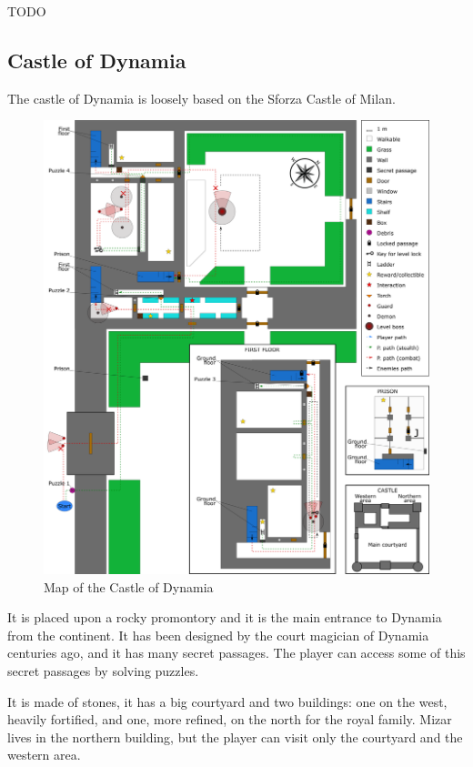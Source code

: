 TODO

\subsection{Castle of Dynamia}
The castle of Dynamia is loosely based on the Sforza Castle of Milan.

\begin{figure}[H]
  \centering
  \includegraphics[width=\textwidth]{Images/Maps/castleOfDynamia}
  \caption{Map of the Castle of Dynamia}
\end{figure}

It is placed upon a rocky promontory and it is the main entrance to Dynamia from the continent. It has been designed by the court magician of Dynamia centuries ago, and it has many secret passages. The player can access some of this secret passages by solving puzzles.

It is made of stones, it has a big courtyard and two buildings: one on the west, heavily fortified, and one, more refined, on the north for the royal family. Mizar lives in the northern building, but the player can visit only the courtyard and the western area.

